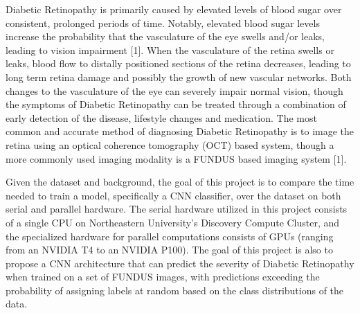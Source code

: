 Diabetic Retinopathy is primarily caused by elevated levels of blood sugar over consistent, prolonged periods of time. Notably, elevated blood sugar levels increase the probability that the vasculature of the eye swells and/or leaks, leading to vision impairment [1]. When the vasculature of the retina swells or leaks, blood flow to distally positioned sections of the retina decreases, leading to long term retina damage and possibly the growth of new vascular networks. Both changes to the vasculature of the eye can severely impair normal vision, though the symptoms of Diabetic Retinopathy can be treated through a combination of early detection of the disease, lifestyle changes and medication. The most common and accurate method of diagnosing Diabetic Retinopathy is to image the retina using an optical coherence tomography (OCT) based system, though a more commonly used imaging modality is a FUNDUS based imaging system [1].

Given the dataset and background, the goal of this project is to compare the time needed to train a model, specifically a CNN classifier, over the dataset on both serial and parallel hardware. The serial hardware utilized in this project consists of a single CPU on Northeastern University's Discovery Compute Cluster, and the specialized hardware for parallel computations consists of GPUs (ranging from an NVIDIA T4 to an NVIDIA P100). The goal of this project is also to propose a CNN architecture that can predict the severity of Diabetic Retinopathy when trained on a set of FUNDUS images, with predictions exceeding the probability of assigning labels at random based on the class distributions of the data.
